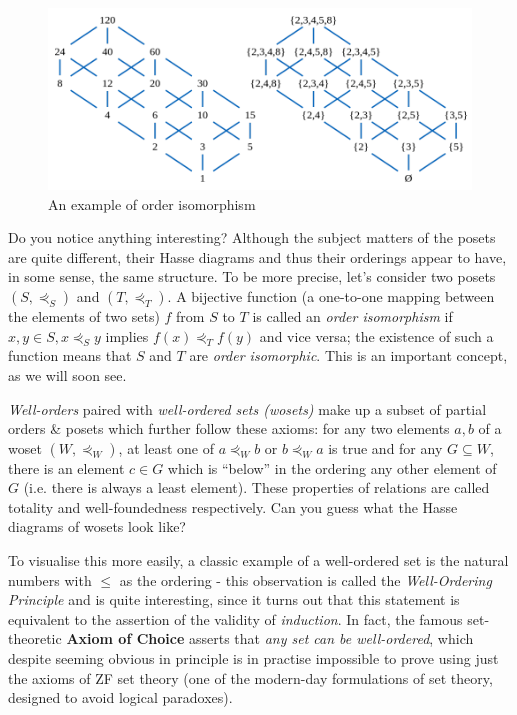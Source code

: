 \begin{figure}[h]
\centering
\includegraphics{graph}
\caption{An example of order isomorphism}
\end{figure}

Do you notice anything interesting? Although the subject matters of the posets are quite different, their Hasse diagrams and thus their orderings appear to have, in some sense, the same structure. To be more precise, let's consider two posets \((S, \curlyeqprec_S)\) and \((T, \curlyeqprec_T)\). A bijective function (a one-to-one mapping between the elements of two sets) \(f\) from \(S\) to \(T\) is called an \textit{order isomorphism} if \( x, y \in S, x \curlyeqprec_S y\) implies \( f(x) \curlyeqprec_T f(y) \) and vice versa; the existence of such a function means that \(S\) and \(T\) are \textit{order isomorphic}. This is an important concept, as we will soon see.

\textit{Well-orders} paired with \textit{well-ordered sets (wosets)} make up a subset of partial orders \& posets which further follow these axioms: for any two elements \(a, b\) of a woset \((W, \curlyeqprec_W)\), at least one of \( a \curlyeqprec_W b\) or \(b\curlyeqprec_Wa\) is true and for any \(G \subseteq W \), there is an element \(c \in G \) which is ``below'' in the ordering any other element of \(G\) (i.e. there is always a least element). These properties of relations are called totality and well-foundedness respectively. Can you guess what the Hasse diagrams of wosets look like?

To visualise this more easily, a classic example of a well-ordered set is the natural numbers with \( \leq \) as the ordering - this observation is called the \textit{Well-Ordering Principle} and is quite interesting, since it turns out that this statement is equivalent to the assertion of the validity of \textit{induction}. In fact, the famous set-theoretic \textbf{Axiom of Choice} asserts that \textit{any set can be well-ordered}, which despite seeming obvious in principle is in practise impossible to prove using just the axioms of ZF set theory (one of the modern-day formulations of set theory, designed to avoid logical paradoxes).

